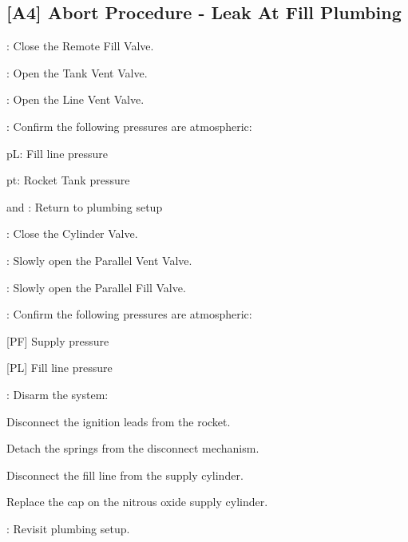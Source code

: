 \begin{checklist}
\subsection{[A4] Abort Procedure - Leak At Fill Plumbing}
\begin{checklist}
    \item \control{}: Close the Remote Fill Valve.
    \item \control{}: Open the Tank Vent Valve.
    \item \control{}: Open the Line Vent Valve.
    \item \control{}: Confirm the following pressures are atmospheric:
    \begin{checklist}
        \item pL: Fill line pressure
        \item pt: Rocket Tank pressure
    \end{checklist}
    \item \primary{} and \secondary{}: Return to plumbing setup
    \item \primary{}: Close the Cylinder Valve.
    \item \primary{}: Slowly open the Parallel Vent Valve.
    \item \primary{}: Slowly open the Parallel Fill Valve.
    \item \control{}: Confirm the following pressures are atmospheric:
    \begin{checklist}
        \item {[PF]} Supply pressure
        \item {[PL]} Fill line pressure
    \end{checklist}
    \item \primary{}: Disarm the system:
        \begin{checklist}    
            \item Disconnect the ignition leads from the rocket.
            \item Detach the springs from the disconnect mechanism.
            \item Disconnect the fill line from the supply cylinder.
            \item Replace the cap on the nitrous oxide supply cylinder.
        \end{checklist}
    \item \ops{}: Revisit plumbing setup.
\end{checklist}
\setcounter{checklistnum}{0}


\end{checklist}
